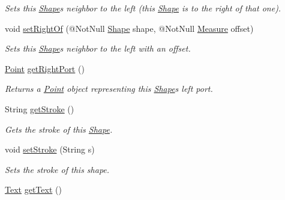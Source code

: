 \begin{DoxyCompactItemize}
\begin{DoxyCompactList}\small\item\em Sets this \hyperlink{classcom_1_1aarrelaakso_1_1drawl_1_1_shape}{Shape}\textquotesingle{}s neighbor to the left (this \hyperlink{classcom_1_1aarrelaakso_1_1drawl_1_1_shape}{Shape} is to the right of that one). \end{DoxyCompactList}\item 
void \hyperlink{classcom_1_1aarrelaakso_1_1drawl_1_1_shape_a6be6bb2859ccc4fd6e55e85aac5ec255}{set\+Right\+Of} (@Not\+Null \hyperlink{classcom_1_1aarrelaakso_1_1drawl_1_1_shape}{Shape} shape, @Not\+Null \hyperlink{classcom_1_1aarrelaakso_1_1drawl_1_1_measure}{Measure} offset)
\begin{DoxyCompactList}\small\item\em Sets this \hyperlink{classcom_1_1aarrelaakso_1_1drawl_1_1_shape}{Shape}\textquotesingle{}s neighbor to the left with an offset. \end{DoxyCompactList}\item 
\hyperlink{classcom_1_1aarrelaakso_1_1drawl_1_1_point}{Point} \hyperlink{classcom_1_1aarrelaakso_1_1drawl_1_1_shape_a319c78d425ec91e1aef1072a95e349ad}{get\+Right\+Port} ()
\begin{DoxyCompactList}\small\item\em Returns a \hyperlink{classcom_1_1aarrelaakso_1_1drawl_1_1_point}{Point} object representing this \hyperlink{classcom_1_1aarrelaakso_1_1drawl_1_1_shape}{Shape}\textquotesingle{}s left port. \end{DoxyCompactList}\item 
String \hyperlink{classcom_1_1aarrelaakso_1_1drawl_1_1_shape_a4e1d54c7e161e3af5053939ddefdf9e6}{get\+Stroke} ()
\begin{DoxyCompactList}\small\item\em Gets the stroke of this \hyperlink{classcom_1_1aarrelaakso_1_1drawl_1_1_shape}{Shape}. \end{DoxyCompactList}\item 
void \hyperlink{classcom_1_1aarrelaakso_1_1drawl_1_1_shape_a3930f6fe72f6c5e0c0aa4c25ffbf18ff}{set\+Stroke} (String s)
\begin{DoxyCompactList}\small\item\em Sets the stroke of this shape. \end{DoxyCompactList}\item 
\hyperlink{classcom_1_1aarrelaakso_1_1drawl_1_1_text}{Text} \hyperlink{classcom_1_1aarrelaakso_1_1drawl_1_1_shape_a6f876978d4102974fedc5b41c93c7b26}{get\+Text} ()

\end{DoxyCompactItemize}
